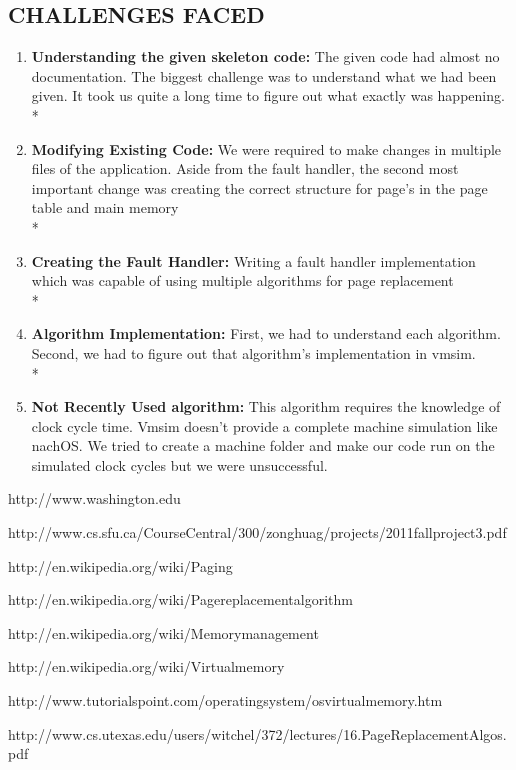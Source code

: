 \documentclass[12pt, oneside, a4paper]{report}
\begin{document}
\subsection*{CHALLENGES FACED}
\begin{enumerate}
\item \textbf{Understanding the given skeleton code:} The given code had almost no documentation. The biggest challenge was to understand what we had been given. It took us quite a long time to figure out what exactly was happening.
\\*
\item \textbf{Modifying Existing Code:} We were required to make changes in multiple files of the application. Aside from the fault handler, the second most important change was creating the correct structure for page's in the page table and main memory
\\*
\item \textbf{Creating the Fault Handler:} Writing a fault handler implementation which was capable of using multiple algorithms for page replacement
\\*
\item \textbf{Algorithm Implementation:} First, we had to understand each algorithm. Second, we had to figure out that algorithm's implementation in vmsim.
\\*
\item \textbf{Not Recently Used algorithm:} This algorithm requires the knowledge of clock cycle time. Vmsim doesn't provide a complete machine simulation like nachOS. We tried to create a machine folder and make our code run on the simulated clock cycles but we were unsuccessful.

\end{enumerate}

\newpage
 \begin{thebibliography}{1}

   http://www.washington.edu

   http://www.cs.sfu.ca/CourseCentral/300/zonghuag/projects/2011fallproject3.pdf

   http://en.wikipedia.org/wiki/Paging
   
   http://en.wikipedia.org/wiki/Pagereplacementalgorithm
  
   http://en.wikipedia.org/wiki/Memorymanagement
  
   http://en.wikipedia.org/wiki/Virtualmemory
  
   http://www.tutorialspoint.com/operatingsystem/osvirtualmemory.htm
  
   http://www.cs.utexas.edu/users/witchel/372/lectures/16.PageReplacementAlgos.pdf
  
    
  \end{thebibliography}
\end{document}
